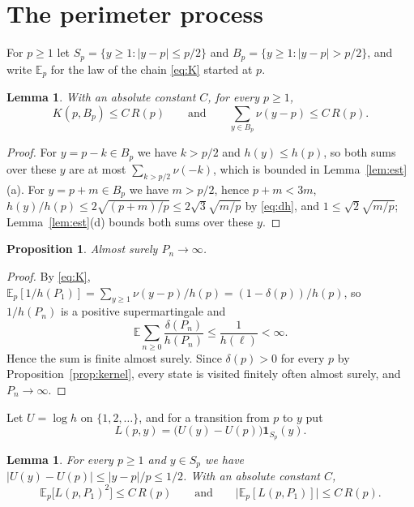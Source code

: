 \documentclass[11pt]{amsart}
\newtheorem{lemma}[theorem]{Lemma}
\newtheorem{proposition}[theorem]{Proposition}
\theoremstyle{remark}
\numberwithin{equation}{section}
\newcommand{\E}{\mathbb E}
\newcommand{\1}{\mathbf 1}
\begin{document}
\section{The perimeter process}\label{sec:perimeter}

For $p\ge1$ let $S_p=\{y\ge1:|y-p|\le p/2\}$ and $B_p=\{y\ge1:|y-p|>p/2\}$, and write $\E_p$ for the law of the chain \eqref{eq:K} started at $p$.

\begin{lemma}\label{lem:big}
With an absolute constant $C$, for every $p\ge1$,
\[
K(p,B_p)\le C\,R(p)\qquad\text{and}\qquad\sum_{y\in B_p}\nu(y-p)\le C\,R(p).
\]
\end{lemma}

\begin{proof}
For $y=p-k\in B_p$ we have $k>p/2$ and $h(y)\le h(p)$, so both sums over these $y$ are at most $\sum_{k>p/2}\nu(-k)$, which is bounded in Lemma~\ref{lem:est}(a). For $y=p+m\in B_p$ we have $m>p/2$, hence $p+m<3m$, $h(y)/h(p)\le2\sqrt{(p+m)/p}\le2\sqrt3\sqrt{m/p}$ by \eqref{eq:dh}, and $1\le\sqrt2\sqrt{m/p}$; Lemma~\ref{lem:est}(d) bounds both sums over these $y$.
\end{proof}

\begin{proposition}\label{prop:escape}
Almost surely $P_n\to\infty$.
\end{proposition}

\begin{proof}
By \eqref{eq:K}, $\E_p[1/h(P_1)]=\sum_{y\ge1}\nu(y-p)/h(p)=(1-\delta(p))/h(p)$, so $1/h(P_n)$ is a positive supermartingale and
\[
\E\sum_{n\ge0}\frac{\delta(P_n)}{h(P_n)}\le\frac1{h(\ell)}<\infty .
\]
Hence the sum is finite almost surely. Since $\delta(p)>0$ for every $p$ by Proposition~\ref{prop:kernel}, every state is visited finitely often almost surely, and $P_n\to\infty$.
\end{proof}

Let $U=\log h$ on $\{1,2,\dots\}$, and for a transition from $p$ to $y$ put
\[
L(p,y)=\bigl(U(y)-U(p)\bigr)\1_{S_p}(y).
\]

\begin{lemma}\label{lem:L}
For every $p\ge1$ and $y\in S_p$ we have $|U(y)-U(p)|\le|y-p|/p\le1/2$. With an absolute constant $C$,
\[
\E_p\bigl[L(p,P_1)^2\bigr]\le C\,R(p)\qquad\text{and}\qquad\bigl|\E_p[L(p,P_1)]\bigr|\le C\,R(p).
\]
\end{lemma}
\end{document}
